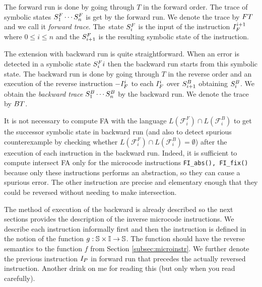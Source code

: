 The forward run is done by going through $T$ in the forward order.
The trace of symbolic states $S^{F}_1 \cdots S^{F}_n$ is get by the forward run.
We denote the trace by $FT$ and we call it \emph{forward trace}.
The~state $S^{F}_{i}$ is the input of the instruction $I^{i+1}_{F}$
where $ 0 \leq i \leq n$ and the $S^{F}_{i+1}$ is the resulting symbolic state
of the instruction.

The extension with backward run is quite straightforward.
When an error is detected in a symbolic state $S^{F}_{i}{i}$
then the backward run starts from this symbolic state.
The backward run is done by going through $T$ in the reverse order
and an execution of the reverse instruction $-I_{F}^{i}$ to each $I^{i}_{F}$
over $S^{B}_{i+1}$ obtaining $S^{B}_{i}$.
We obtain the \emph{backward trace} $S^{B}_1 \cdots S^{B}_n$ by the backward run.
We denote the trace by $BT$.

It is not necessary to compute FA with the language
$L(\mathcal{F}_i^F) \cap L(\mathcal{F}_i^B)$ to get the successor
symbolic state in backward run (and also to detect spurious counterexample
by checking whether $L(\mathcal{F}_i^F) \cap L(\mathcal{F}_i^B) = \emptyset$)
after the execution of each instruction in the backward run.
Indeed, it is sufficient to compute intersect FA only for
the microcode instructions {\tt FI\_abs(), FI\_fix()}
because only these instructions performs an abstraction,
so they can cause a spurious error.
The other instruction are precise and elementary enough
that they could be reversed without needing to make intersection.

The method of execution of the backward is already described so
the next sections provides the description of the inverse microcode instructions.
We describe each instruction informally first and then the instruction is defined in the notion
of the function $g: \mathbb{S} \times \mathbb{I} \rightarrow \mathbb{S}$.
The function should have the reverse semantics
to the function $f$ from Section \ref{subsec:microinstr}.
We further denote the previous instruction $I_{P}$ in forward run
that precedes the actually reversed instruction.
Another drink on me for reading this (but only when you read carefully). %

